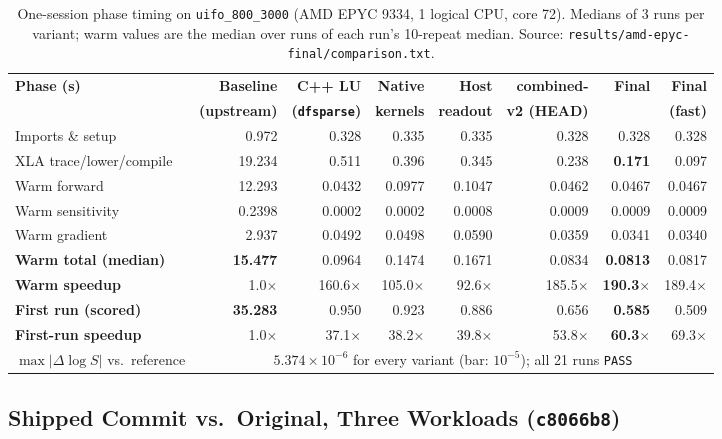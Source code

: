 \documentclass[11pt,a4paper]{article}
\begin{document}
\begin{table}[h]
\centering
\small
\setlength{\tabcolsep}{4pt}
\begin{tabular}{@{}lrrrrrrr@{}}
\toprule
\textbf{Phase (s)} & \textbf{Baseline} & \textbf{C++ LU} & \textbf{Native} & \textbf{Host} & \textbf{combined-} & \textbf{Final} & \textbf{Final} \\
 & \textbf{(upstream)} & \textbf{(\texttt{dfsparse})} & \textbf{kernels} & \textbf{readout} & \textbf{v2 (HEAD)} & & \textbf{(fast)} \\
\midrule
Imports \& setup & 0.972 & 0.328 & 0.335 & 0.335 & 0.328 & 0.328 & 0.328 \\
XLA trace/lower/compile & 19.234 & 0.511 & 0.396 & 0.345 & 0.238 & \textbf{0.171} & 0.097 \\
\midrule
Warm forward & 12.293 & 0.0432 & 0.0977 & 0.1047 & 0.0462 & 0.0467 & 0.0467 \\
Warm sensitivity & 0.2398 & 0.0002 & 0.0002 & 0.0008 & 0.0009 & 0.0009 & 0.0009 \\
Warm gradient & 2.937 & 0.0492 & 0.0498 & 0.0590 & 0.0359 & 0.0341 & 0.0340 \\
\textbf{Warm total (median)} & \textbf{15.477} & 0.0964 & 0.1474 & 0.1671 & 0.0834 & \textbf{0.0813} & 0.0817 \\
\textbf{Warm speedup} & 1.0$\times$ & 160.6$\times$ & 105.0$\times$ & 92.6$\times$ & 185.5$\times$ & \textbf{190.3$\times$} & 189.4$\times$ \\
\midrule
\textbf{First run (scored)} & \textbf{35.283} & 0.950 & 0.923 & 0.886 & 0.656 & \textbf{0.585} & 0.509 \\
\textbf{First-run speedup} & 1.0$\times$ & 37.1$\times$ & 38.2$\times$ & 39.8$\times$ & 53.8$\times$ & \textbf{60.3$\times$} & 69.3$\times$ \\
\midrule
$\max|\Delta \log S|$ vs.\ reference & \multicolumn{7}{c}{$5.374\times 10^{-6}$ for every variant (bar: $10^{-5}$); all 21 runs \texttt{PASS}} \\
\bottomrule
\end{tabular}
\caption{One-session phase timing on \texttt{uifo\_800\_3000} (AMD EPYC 9334, 1 logical CPU, core 72). Medians of 3 runs per variant; warm values are the median over runs of each run's 10-repeat median. Source: \texttt{results/amd-epyc-final/comparison.txt}.}
\label{tab:benchmarks}
\end{table}

\subsection{Shipped Commit vs.\ Original, Three Workloads (\texttt{c8066b8})}
\end{document}
